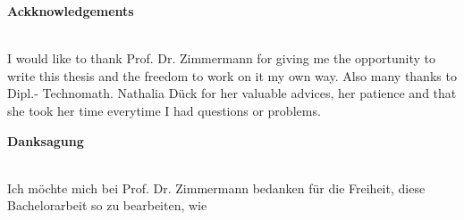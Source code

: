 

\begin{center}
\large \textbf{Ackknowledgements} \\
~\\ %


\end{center}
I would like to thank Prof. Dr. Zimmermann for giving me the opportunity to write this thesis and the freedom to work on it my own way. Also many thanks to Dipl.- Technomath. Nathalia Dück for her valuable advices, her patience and that she took her time everytime I had questions or problems. 

\vfill %
\begin{center}
\large \textbf{Danksagung} \\
~\\ %
\end{center}
Ich möchte mich bei Prof. Dr. Zimmermann bedanken für die Freiheit, diese Bachelorarbeit so zu bearbeiten, wie  